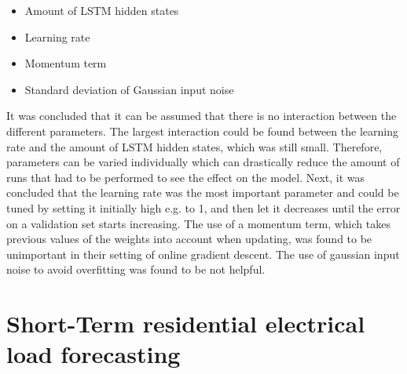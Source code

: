 \begin{itemize}
	\item Amount of LSTM hidden states
	\item Learning rate
	\item Momentum term
	\item Standard deviation of Gaussian input noise
\end{itemize}

It was concluded that it can be assumed that there is no interaction between the different parameters. The largest interaction could be found between the learning rate and the amount of LSTM hidden states, which was still small. Therefore, parameters can be varied individually which can drastically reduce the amount of runs that had to be performed to see the effect on the model. Next, it was concluded that the learning rate was the most important parameter and could be tuned by setting it initially high e.g. to 1, and then let it decreases until the error on a validation set starts increasing. The use of a momentum term, which takes previous values of the weights into account when updating, was found to be unimportant in their setting of online gradient descent. The use of gaussian input noise to avoid overfitting was found to be not helpful. 

\section{Short-Term residential electrical load forecasting}\label{s:Short-Term residential electrical load forecasting}



